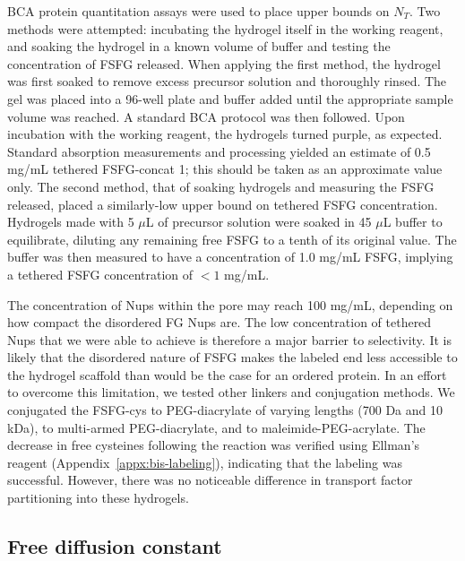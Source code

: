  BCA protein quantitation assays were used to place upper bounds on $N_T$.  Two methods were attempted: incubating the hydrogel itself in the working reagent, and soaking the hydrogel in a known volume of buffer and testing the concentration of FSFG released.  When applying the first method, the hydrogel was first soaked to remove excess precursor solution and thoroughly rinsed.  The gel was placed into a 96-well plate and buffer added until the appropriate sample volume was reached.  A standard BCA protocol was then followed.  Upon incubation with the working reagent, the hydrogels turned purple, as expected.  Standard absorption measurements and processing yielded an estimate of 0.5 mg/mL tethered FSFG-concat 1; this should be taken as an approximate value only.  The second method, that of soaking hydrogels and measuring the FSFG released, placed a similarly-low upper bound on tethered FSFG concentration.  Hydrogels made with 5 $\mu$L of precursor solution were soaked in 45 $\mu$L buffer to equilibrate, diluting any remaining free FSFG to a tenth of its original value.  The buffer was then measured to have a concentration of 1.0 mg/mL FSFG, implying a tethered FSFG concentration of $<1$ mg/mL.

The concentration of Nups within the pore may reach 100 mg/mL, depending on how compact the disordered FG Nups are.  The low concentration of tethered Nups that we were able to achieve is therefore a major barrier to selectivity.  It is likely that the disordered nature of FSFG makes the labeled end less accessible to the hydrogel scaffold than would be the case for an ordered protein.  In an effort to overcome this limitation, we tested other linkers and conjugation methods.  We conjugated the FSFG-cys to PEG-diacrylate of varying lengths (700 Da and 10 kDa), to multi-armed PEG-diacrylate, and to maleimide-PEG-acrylate.  The decrease in free cysteines following the reaction was verified using Ellman's reagent (Appendix~\ref{appx:bis-labeling}), indicating that the labeling was successful.  However, there was no noticeable difference in transport factor partitioning into these hydrogels.

\subsection{Free diffusion constant}

